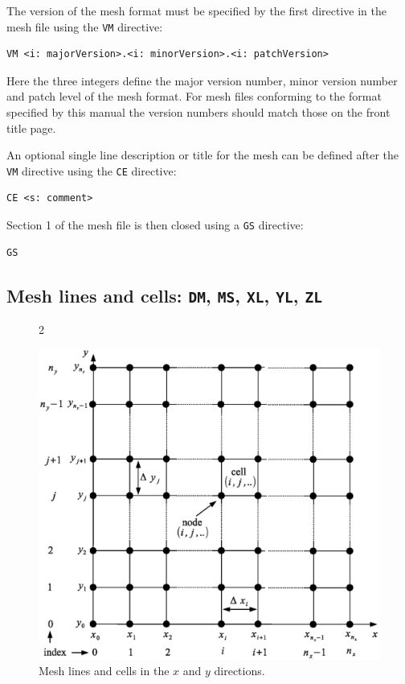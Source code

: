 \documentclass[onecolumn,a4paper]{article}
\numberwithin{equation}{section}
\begin{document}
The version of the mesh format must be specified by the first directive in the mesh file using the 
\texttt{VM} directive:
\begin{verbatim}
VM <i: majorVersion>.<i: minorVersion>.<i: patchVersion>
\end{verbatim}
Here the three integers define the major version number, minor version number and patch
level of the mesh format. For mesh files conforming to the format specified by this manual
the version numbers should match those on the front title page. 

An optional single line description or title for the mesh can be defined after the 
\texttt{VM} directive using the \texttt{CE} directive:
\begin{verbatim}
CE <s: comment>
\end{verbatim}
Section 1 of the mesh file is then closed using a \texttt{GS} directive:
\begin{verbatim}
GS
\end{verbatim}

\subsection{Mesh lines and cells: \texttt{DM}, \texttt{MS}, \texttt{XL}, \texttt{YL}, \texttt{ZL}}

\begin{figure}[ht]
2\centerline{\includegraphics[width=12cm]{figures/meshdefn}}
\caption{\label{fg:meshdefn} Mesh lines and cells in the $x$ and $y$ directions.}
\end{figure}
\end{document}
